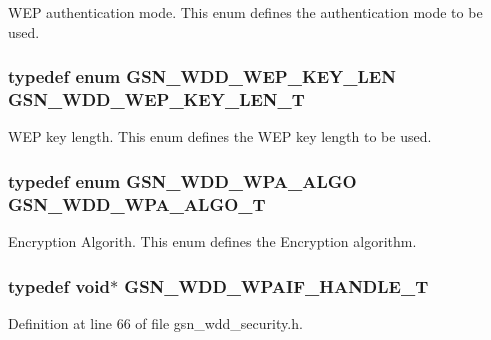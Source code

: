 WEP authentication mode. This enum defines the authentication mode to be used. 

\hypertarget{a00604_a8c3a847d44b6c5df18ed812cf0efca62}{
\subsubsection[{GSN\_\-WDD\_\-WEP\_\-KEY\_\-LEN\_\-T}]{\setlength{\rightskip}{0pt plus 5cm}typedef enum {\bf GSN\_\-WDD\_\-WEP\_\-KEY\_\-LEN} {\bf GSN\_\-WDD\_\-WEP\_\-KEY\_\-LEN\_\-T}}}
\label{a00604_a8c3a847d44b6c5df18ed812cf0efca62}


WEP key length. This enum defines the WEP key length to be used. 

\hypertarget{a00604_ae6d4a101986255ba5cb98e42ff3fb2ef}{
\subsubsection[{GSN\_\-WDD\_\-WPA\_\-ALGO\_\-T}]{\setlength{\rightskip}{0pt plus 5cm}typedef enum {\bf GSN\_\-WDD\_\-WPA\_\-ALGO} {\bf GSN\_\-WDD\_\-WPA\_\-ALGO\_\-T}}}
\label{a00604_ae6d4a101986255ba5cb98e42ff3fb2ef}


Encryption Algorith. This enum defines the Encryption algorithm. 

\hypertarget{a00604_abe0c512b373bf02e6fb6185079cb6f0c}{
\subsubsection[{GSN\_\-WDD\_\-WPAIF\_\-HANDLE\_\-T}]{\setlength{\rightskip}{0pt plus 5cm}typedef void$\ast$ {\bf GSN\_\-WDD\_\-WPAIF\_\-HANDLE\_\-T}}}
\label{a00604_abe0c512b373bf02e6fb6185079cb6f0c}


Definition at line 66 of file gsn\_\-wdd\_\-security.h.

